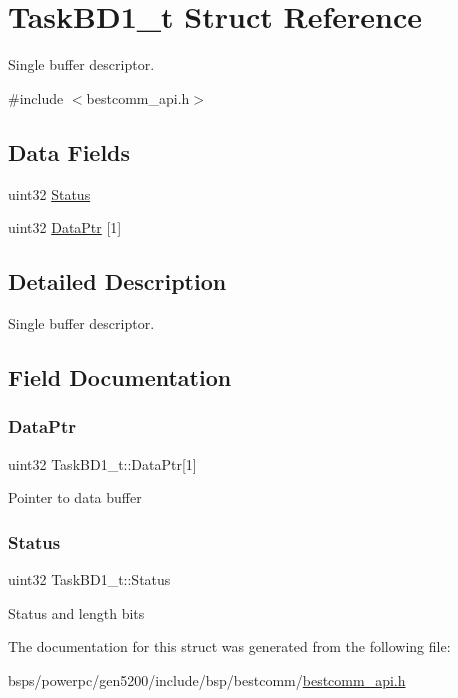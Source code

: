 \hypertarget{structTaskBD1__t}{}\section{Task\+B\+D1\+\_\+t Struct Reference}
\label{structTaskBD1__t}


Single buffer descriptor.  




{\ttfamily \#include $<$bestcomm\+\_\+api.\+h$>$}

\subsection*{Data Fields}
\begin{DoxyCompactItemize}
\item 
uint32 \mbox{\hyperlink{structTaskBD1__t_a043827fb657663b338c5e6db30db1cb6}{Status}}
\item 
uint32 \mbox{\hyperlink{structTaskBD1__t_ad95700c3a7fa075d213bf5db23f3ee98}{Data\+Ptr}} \mbox{[}1\mbox{]}
\end{DoxyCompactItemize}


\subsection{Detailed Description}
Single buffer descriptor. 

\subsection{Field Documentation}
\mbox{\label{structTaskBD1__t_ad95700c3a7fa075d213bf5db23f3ee98}} 
\subsubsection{\texorpdfstring{DataPtr}{DataPtr}}
{\footnotesize\ttfamily uint32 Task\+B\+D1\+\_\+t\+::\+Data\+Ptr\mbox{[}1\mbox{]}}

Pointer to data buffer \mbox{\label{structTaskBD1__t_a043827fb657663b338c5e6db30db1cb6}} 
\subsubsection{\texorpdfstring{Status}{Status}}
{\footnotesize\ttfamily uint32 Task\+B\+D1\+\_\+t\+::\+Status}

Status and length bits 

The documentation for this struct was generated from the following file\+:\begin{DoxyCompactItemize}
\item 
bsps/powerpc/gen5200/include/bsp/bestcomm/\mbox{\hyperlink{bestcomm__api_8h}{bestcomm\+\_\+api.\+h}}\end{DoxyCompactItemize}
